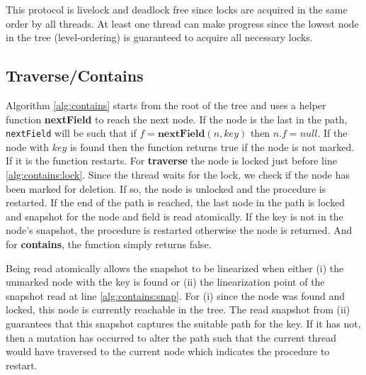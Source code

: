 \documentclass[conference]{IEEEtran}
\theoremstyle{definition}
\theoremstyle{theorem}
\begin{document}
This protocol is livelock and deadlock free since locks are acquired in the same order by all threads. At least one thread can make progress since the lowest node in the tree (level-ordering) is guaranteed to acquire all necessary locks.

\subsection{Traverse/Contains}
Algorithm \ref{alg:contains} starts from the root of the tree and uses a helper function \textbf{nextField} to reach the next node. If the node is the last in the path, \texttt{nextField} will be such that if $f=\mathbf{nextField}(n, key)$ then $n.f = null$. If the node with $key$ is found then the function returns true if the node is not marked. If it is the function restarts. For \textbf{traverse} the node is locked just before line \ref{alg:contains:lock}. Since the thread waits for the lock, we check if the node has been marked for deletion. If so, the node is unlocked and the procedure is restarted. If the end of the path is reached, the last node in the path is locked and snapshot for the node and field is read atomically. If the key is not in the node's snapshot, the procedure is restarted otherwise the node is returned. And for \textbf{contains}, the function simply returns false.

Being read atomically allows the snapshot to be linearized when either (i) the unmarked node with the key is found or (ii) the linearization point of the snapshot read at line \ref{alg:contains:snap}. For (i) since the node was found and locked, this node is currently reachable in the tree. The read snapshot from (ii) guarantees  that this snapshot captures the suitable path for the key. If it has not, then a mutation has occurred to alter the path such that the current thread would have traversed to the current node which indicates the procedure to restart.
\end{document}
